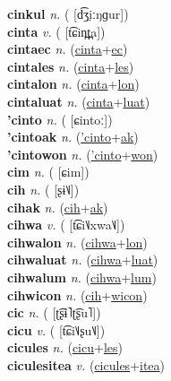 \textbf{cinkul} \textit{n.} ( [d͡ʒ̤iːŋɡur])
 \label{cinkul} \\
\textbf{cinta} \textit{v.} ( [t͡ɕin̪t̪a])
 \label{cinta} \\
\textbf{cintaec} \textit{n.} (\hyperref[cinta]{cinta}+\hyperref[ec]{ec})
 \label{cintaec} \\
\textbf{cintales} \textit{n.} (\hyperref[cinta]{cinta}+\hyperref[les]{les})
 \label{cintales} \\
\textbf{cintalon} \textit{n.} (\hyperref[cinta]{cinta}+\hyperref[lon]{lon})
 \label{cintalon} \\
\textbf{cintaluat} \textit{n.} (\hyperref[cinta]{cinta}+\hyperref[luat]{luat})
 \label{cintaluat} \\
\textbf{'cinto} \textit{n.} ( [ɕintoː])
 \label{'cinto} \\
\textbf{'cintoak} \textit{n.} (\hyperref['cinto]{'cinto}+\hyperref[ak]{ak})
 \label{'cintoak} \\
\textbf{'cintowon} \textit{n.} (\hyperref['cinto]{'cinto}+\hyperref[won]{won})
 \label{'cintowon} \\
\textbf{cim} \textit{n.} ( [ɕim])
 \label{cim} \\
\textbf{cih} \textit{n.} ( [ʂɨ˥˩])
 \label{cih} \\
\textbf{cihak} \textit{n.} (\hyperref[cih]{cih}+\hyperref[ak]{ak})
 \label{cihak} \\
\textbf{cihwa} \textit{v.} ( [t͡ɕi˥˩xwa˥˩])
 \label{cihwa} \\
\textbf{cihwalon} \textit{n.} (\hyperref[cihwa]{cihwa}+\hyperref[lon]{lon})
 \label{cihwalon} \\
\textbf{cihwaluat} \textit{n.} (\hyperref[cihwa]{cihwa}+\hyperref[luat]{luat})
 \label{cihwaluat} \\
\textbf{cihwalum} \textit{n.} (\hyperref[cihwa]{cihwa}+\hyperref[lum]{lum})
 \label{cihwalum} \\
\textbf{cihwicon} \textit{n.} (\hyperref[cih]{cih}+\hyperref[wicon]{wicon})
 \label{cihwicon} \\
\textbf{cic} \textit{n.} ( [ʈ͡ʂɨ˥ʈ͡ʂu˥])
 \label{cic} \\
\textbf{cicu} \textit{v.} ( [t͡ɕi˥˩ʂu˥˩])
 \label{cicu} \\
\textbf{cicules} \textit{n.} (\hyperref[cicu]{cicu}+\hyperref[les]{les})
 \label{cicules} \\
\textbf{ciculesitea} \textit{v.} (\hyperref[cicules]{cicules}+\hyperref[itea]{itea})
